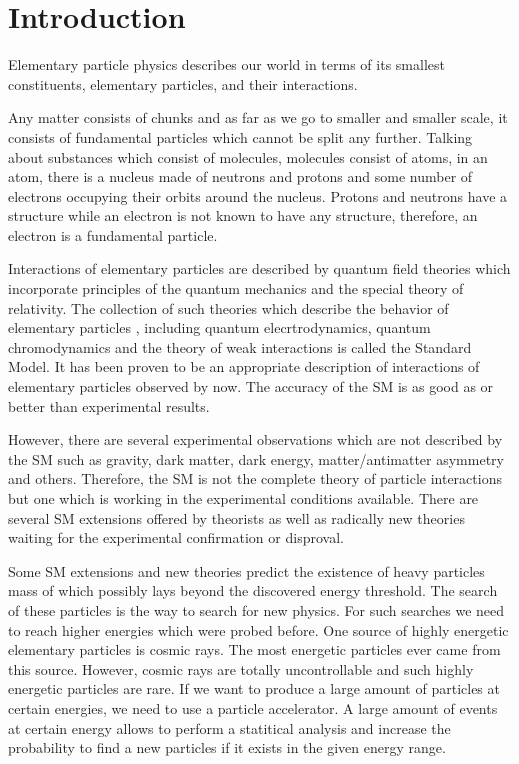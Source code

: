 \section{Introduction}
\label{sec:intro}


Elementary particle physics describes our world in terms of its smallest constituents, elementary particles, and their interactions. 

Any matter consists of chunks and as far as we go to smaller and smaller scale, it consists of fundamental particles which cannot be split any further. Talking about substances which consist of molecules, molecules consist of atoms, in an atom, there is a nucleus made of neutrons and protons and some number of electrons occupying their orbits around the nucleus. Protons and neutrons have a structure while an electron is not known to have any structure, therefore, an electron is a fundamental particle.

Interactions of elementary particles are described by quantum field theories which incorporate principles of the quantum mechanics and the special theory of relativity. The collection of such theories which describe the behavior of elementary particles , including quantum elecrtrodynamics, quantum chromodynamics and the theory of weak interactions is called the Standard Model. It has been proven to be an appropriate description of interactions of elementary particles observed by now. The accuracy of the SM is as good as or better than experimental results.

However, there are several experimental observations which are not described by the SM such as gravity, dark matter, dark energy, matter/antimatter asymmetry and others. Therefore, the SM is not the complete theory of particle interactions but one which is working in the experimental conditions available. There are several SM extensions offered by theorists as well as radically new theories waiting for the experimental confirmation or disproval. 

Some SM extensions and new theories predict the existence of heavy particles mass of which possibly lays beyond the discovered energy threshold. The search of these particles is the way to search for new physics. For such searches we need to reach higher energies which were probed before. One source of highly energetic elementary particles is cosmic rays. The most energetic particles ever came from this source. However, cosmic rays are totally uncontrollable and such highly energetic particles are rare. If we want to produce a large amount of particles at certain energies, we need to use a particle accelerator. A large amount of events at certain energy allows to perform a statitical analysis and increase the probability to find a new particles if it exists in the given energy range.

